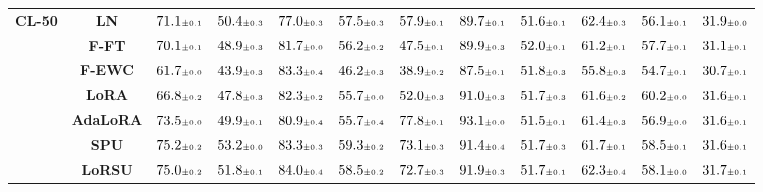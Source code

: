 \begin{table}
\begin{center}
\begin{small}
\begin{tabular}{l c c c c c c c c c c c}
\midrule
\multirow{7}{*}{\textbf{CL-50}} & \textbf{LN} & $71.1 \mtiny{\pm 0.1}$ & $50.4 \mtiny{\pm 0.3}$ & $77.0 \mtiny{\pm 0.3}$ & $57.5 \mtiny{\pm 0.3}$ & $57.9 \mtiny{\pm 0.1}$ & $89.7 \mtiny{\pm 0.1}$ & $51.6 \mtiny{\pm 0.1}$ & $62.4 \mtiny{\pm 0.3}$ & $56.1 \mtiny{\pm 0.1}$ & $31.9 \mtiny{\pm 0.0}$ \\
& \textbf{F-FT} & $70.1 \mtiny{\pm 0.1}$ & $48.9 \mtiny{\pm 0.3}$ & $81.7 \mtiny{\pm 0.0}$ & $56.2 \mtiny{\pm 0.2}$ & $47.5 \mtiny{\pm 0.1}$ & $89.9 \mtiny{\pm 0.3}$ & $52.0 \mtiny{\pm 0.1}$ & $61.2 \mtiny{\pm 0.1}$ & $57.7 \mtiny{\pm 0.1}$ & $31.1 \mtiny{\pm 0.1}$ \\
& \textbf{F-EWC} & $61.7 \mtiny{\pm 0.0}$ & $43.9 \mtiny{\pm 0.3}$ & $83.3 \mtiny{\pm 0.4}$ & $46.2 \mtiny{\pm 0.3}$ & $38.9 \mtiny{\pm 0.2}$ & $87.5 \mtiny{\pm 0.1}$ & $51.8 \mtiny{\pm 0.3}$ & $55.8 \mtiny{\pm 0.3}$ & $54.7 \mtiny{\pm 0.1}$ & $30.7 \mtiny{\pm 0.1}$ \\
& \textbf{LoRA} & $66.8 \mtiny{\pm 0.2}$ & $47.8 \mtiny{\pm 0.3}$ & $82.3 \mtiny{\pm 0.2}$ & $55.7 \mtiny{\pm 0.0}$ & $52.0 \mtiny{\pm 0.3}$ & $91.0 \mtiny{\pm 0.3}$ & $51.7 \mtiny{\pm 0.3}$ & $61.6 \mtiny{\pm 0.2}$ & $60.2 \mtiny{\pm 0.0}$ & $31.6 \mtiny{\pm 0.1}$ \\
& \textbf{AdaLoRA} & $73.5 \mtiny{\pm 0.0}$ & $49.9 \mtiny{\pm 0.1}$ & $80.9 \mtiny{\pm 0.4}$ & $55.7 \mtiny{\pm 0.4}$ & $77.8 \mtiny{\pm 0.1}$ & $93.1 \mtiny{\pm 0.0}$ & $51.5 \mtiny{\pm 0.1}$ & $61.4 \mtiny{\pm 0.3}$ & $56.9 \mtiny{\pm 0.0}$ & $31.6 \mtiny{\pm 0.1}$ \\
& \textbf{SPU} & $75.2 \mtiny{\pm 0.2}$ & $53.2 \mtiny{\pm 0.0}$ & $83.3 \mtiny{\pm 0.3}$ & $59.3 \mtiny{\pm 0.2}$ & $73.1 \mtiny{\pm 0.3}$ & $91.4 \mtiny{\pm 0.4}$ & $51.7 \mtiny{\pm 0.3}$ & $61.7 \mtiny{\pm 0.1}$ & $58.5 \mtiny{\pm 0.1}$ & $31.6 \mtiny{\pm 0.1}$ \\
& \textbf{LoRSU} & $75.0 \mtiny{\pm 0.2}$ & $51.8 \mtiny{\pm 0.1}$ & $84.0 \mtiny{\pm 0.4}$ & $58.5 \mtiny{\pm 0.2}$ & $72.7 \mtiny{\pm 0.3}$ & $91.9 \mtiny{\pm 0.3}$ & $51.7 \mtiny{\pm 0.1}$ & $62.3 \mtiny{\pm 0.4}$ & $58.1 \mtiny{\pm 0.0}$ & $31.7 \mtiny{\pm 0.1}$ \\
\bottomrule
\end{tabular}
\endgroup
\end{small}
\end{center}
\vskip -0.1in
\end{table}


